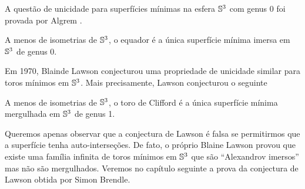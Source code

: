 
A questão de unicidade para superfícies mínimas na esfera $\mathbb{S}^3$ com genus 0 foi provada por Algrem \cite{Almgren1966}.

\begin{teorema}[Almgren]
	A menos de isometrias de $\mathbb{S}^3$, o equador é a única superfície mínima imersa em $\mathbb{S}^3$ de genus 0.
\end{teorema}


%


Em 1970, Blainde Lawson conjecturou uma propriedade de unicidade similar para toros mínimos em $\mathbb{S}^3$. Mais precisamente, Lawson \cite{Lawson1970} conjecturou o seguinte

\begin{conjectura}[Lawson]
	A menos de isometrias de $\mathbb{S}^3$, o toro de Clifford é a única superfície mínima mergulhada em $\mathbb{S}^3$ de genus 1.
\end{conjectura}

Queremos apenas observar que a conjectura de Lawson é falsa se permitirmos que a superfície tenha auto-interseções. De fato, o próprio Blaine Lawson \cite{Lawson1969} provou que existe uma família infinita de toros mínimos em $\mathbb{S}^3$ que são ``Alexandrov imersos'' mas não são mergulhados. Veremos no capítulo seguinte a prova da conjectura de Lawson obtida por Simon Brendle.

%

